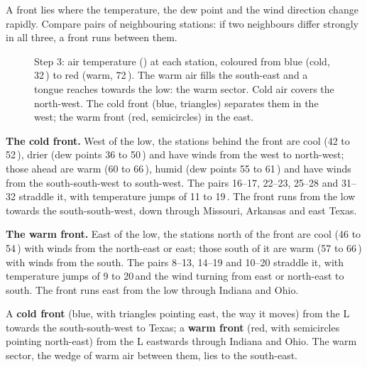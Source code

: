 A front lies where the temperature, the dew point and the wind direction change rapidly. Compare pairs of neighbouring stations: if two neighbours differ strongly in all three, a front runs between them.

\begin{figure}[ht]
\centering
\mapbase{0.0196cm}{}
\caption{Step 3: air temperature (\degF) at each station, coloured from blue (cold, 32\,\degF) to red (warm, 72\,\degF). The warm air fills the south-east and a tongue reaches towards the low: the warm sector. Cold air covers the north-west. The cold front (blue, triangles) separates them in the west; the warm front (red, semicircles) in the east.}\label{p3-fig:airmass}
\end{figure}

\begin{table}[ht]
\centering
\caption{Evidence for the fronts: pairs of stations on either side of each front (cold side $\to$ warm side).}

\end{table}

\textbf{The cold front.} West of the low, the stations behind the front are cool (42 to 52\,\degF), drier (dew points 36 to 50\,\degF) and have winds from the west to north-west; those ahead are warm (60 to 66\,\degF), humid (dew points 55 to 61\,\degF) and have winds from the south-south-west to south-west. The pairs 16--17, 22--23, 25--28 and 31--32 straddle it, with temperature jumps of 11 to 19\,\degF. The front runs from the low towards the south-south-west, down through Missouri, Arkansas and east Texas.

\textbf{The warm front.} East of the low, the stations north of the front are cool (46 to 54\,\degF) with winds from the north-east or east; those south of it are warm (57 to 66\,\degF) with winds from the south. The pairs 8--13, 14--19 and 10--20 straddle it, with temperature jumps of 9 to 20\,\degF and the wind turning from east or north-east to south. The front runs east from the low through Indiana and Ohio.

\begin{answerbox}
A \textbf{cold front} (blue, with triangles pointing east, the way it moves) from the L towards the south-south-west to Texas; a \textbf{warm front} (red, with semicircles pointing north-east) from the L eastwards through Indiana and Ohio. The warm sector, the wedge of warm air between them, lies to the south-east.
\end{answerbox}

